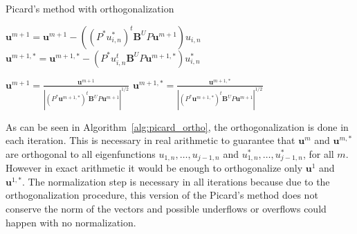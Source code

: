 \documentclass[smallextended]{svjour3}
\begin{document}
\begin{algorithm}[H] \caption{Picard's method with orthogonalization} \label{alg:picard_ortho} 
\begin{algorithmic}

    

\REPEAT



\STATE $\mathbf{u}^{m+1}=\mathbf{u}^{m+1}-((P^*u_{i,n}^*)^t\mathbf{B}^U P\mathbf{u}^{m+1})u_{i,n}$
\STATE $\mathbf{u}^{m+1,*}=\mathbf{u}^{m+1,*}-(P^*u_{i,n}^t\mathbf{B}^U P\mathbf{u}^{m+1,*})u_{i,n}^*$
\ENDFOR


\STATE $\displaystyle \mathbf{u}^{m+1}=\frac{\mathbf{u}^{m+1}}{|(P^*\mathbf{u}^{m+1,*})^t\mathbf{B}^U P\mathbf{u}^{m+1}|^{1/2}}$
\STATE $\displaystyle \mathbf{u}^{m+1,*}=\frac{\mathbf{u}^{m+1,*}}{|(P^*\mathbf{u}^{m+1,*})^t\mathbf{B}^U P\mathbf{u}^{m+1}|^{1/2}}$
\end{algorithmic}
\end{algorithm}
\noindent
As can be seen in Algorithm~\ref{alg:picard_ortho}, the orthogonalization is done in each iteration. 
This is necessary in real arithmetic to guarantee that $\mathbf{u}^m$ and $\mathbf{u}^{m,*}$ are orthogonal to all 
eigenfunctions $u_{1,n},\dots,u_{j-1,n}$ and $u_{1,n}^*,\dots,u_{j-1,n}^*$, for all $m$. However in exact arithmetic it would 
be enough to orthogonalize only $\mathbf{u}^1$ and $\mathbf{u}^{1,*}$. The normalization step is necessary 
in all iterations because due to the orthogonalization procedure, this version of the Picard's 
method does not conserve the norm of the vectors and possible underflows or overflows could 
happen with no normalization.\\
\end{document}
